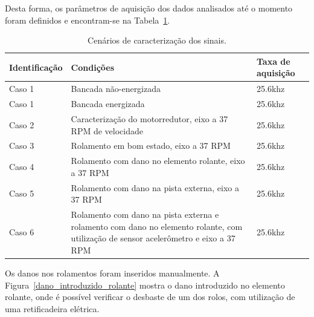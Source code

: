 \documentclass[
	12pt,				
	oneside,			
	a4paper,			
	english,			
	brazil,			
	]{abntex2ppgsi}
\begin{document}
Desta forma, os parâmetros de aquisição dos dados analisados até o momento foram definidos e encontram-se na Tabela~\ref{tab:conjuntoDeTestes}.

\begin{table}[h]
\caption{Cenários de caracterização dos sinais.}
\begin{tabularx}{\textwidth}{|X|X|X|}
\hline
Identificação & Condições~                                                                                                                          & Taxa de aquisição  \\ 
\hline
Caso
1        & Bancada não-energizada                                                                                                              & 25.6khz            \\ 
\hline
Caso 1        & Bancada energizada                                                                                                                  & 25.6khz            \\ 
\hline
Caso 2        & Caracterização do motorredutor, eixo a 37 RPM de velocidade                                                                         & 25.6khz            \\ 
\hline
Caso 3        & Rolamento em bom estado, eixo a 37 RPM                                                                                              & 25.6khz            \\ 
\hline
Caso 4        & Rolamento com dano no elemento rolante, eixo a 37 RPM                                                                               & 25.6khz            \\ 
\hline
Caso 5        & Rolamento com dano na pista externa, eixo a 37 RPM                                                                                  & 25.6khz            \\ 
\hline
Caso 6        & Rolamento com dano na pista externa e rolamento com dano no elemento rolante, com utilização de sensor acelerômetro e eixo a 37 RPM & 25.6khz            \\
\hline
\end{tabularx}
\label{tab:conjuntoDeTestes}
\end{table}

Os danos nos rolamentos foram inseridos manualmente. A Figura~\ref{dano_introduzido_rolante} mostra o dano introduzido no elemento rolante, onde é possível verificar o desbaste de um dos rolos, com utilização de uma retificadeira elétrica.
\end{document}
